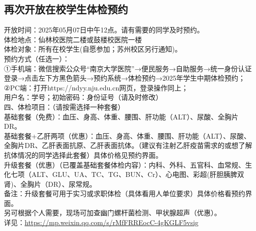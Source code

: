\documentclass[letterpaper, 12pt]{article}
\begin{document}
\begin{multicols}{2}
\section{再次开放在校学生体检预约} %
开放时间：2025年05月07日中午12点。请有需要的同学及时预约。
\\体检地点：仙林校医院二楼或鼓楼校医院一楼
\\体检对象：所有在校学生(自愿参加；苏州校区另行通知)。
\\预约方式（任选一）：
\\①手机端：微信搜索公众号“南京大学医院”→便民服务→自助服务→统一身份认证登录→点击左下方黑色箭头→预约系统→体检预约→2025年学生中期体检预约；
\\②PC端：打开https://ndyy.nju.edu.cn网页，登录操作同上；
\\用户名：学号；初始密码：身份证号（请及时修改）
\\四、体检项目：（请按需选择一种套餐）
\\基础套餐（免费）：血压、身高、体重、腰围、肝功能（ALT）、尿酸、全胸片DR。
\\基础套餐+乙肝两项（优惠）：血压、身高、体重、腰围、肝功能（ALT）、尿酸、全胸片DR、乙肝表面抗原、乙肝表面抗体。（建议有注射乙肝疫苗需求的或想了解抗体情况的同学选择此套餐）具体价格见预约界面。
\\升级套餐（优惠）（已覆盖基础套餐体检内容）：内科、外科、五官科、血常规、生化七项（ALT、GLU、UA、TC、TG、BUN、Cr）、心电图、彩超(肝胆胰脾双肾)、全胸片（DR）、尿常规。
\\备注：升级套餐可用于实习或求职体检（具体看用人单位要求）具体价格看预约界面。
\\另可根据个人需要，现场可加查幽门螺杆菌检测、甲状腺超声（优惠）。
\\详见：\url{https://mp.weixin.qq.com/s/rMfFRREocC-4gKGLF5vsig}


\end{multicols}
\end{document}
